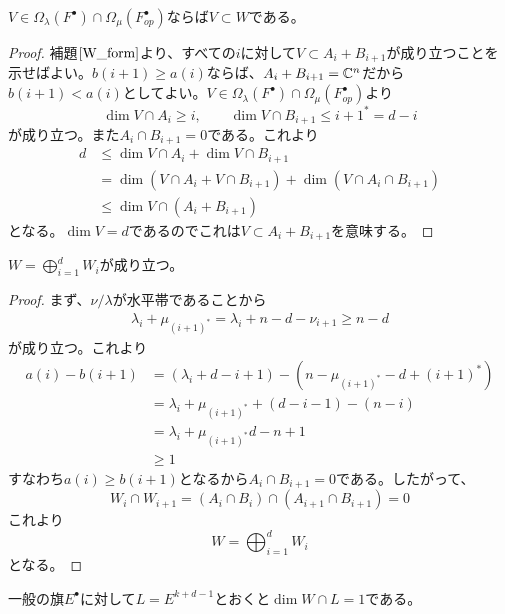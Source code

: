 \documentclass{ltjsreport}
\begin{document}
\begin{lemm}\label{V_subset_W}
  $V\in \Omega_{\lambda}(F^\bullet)\cap\Omega_{\mu}(F^\bullet_{op})$ならば$V\subset W$である。
\end{lemm}

\begin{proof}
  補題$\ref{W_form}$より、すべての$i$に対して$V\subset A_i+B_{i+1}$が成り立つことを示せばよい。$b(i+1)\geq a(i)$ならば、$A_i+B_{i+1}=\mathbb{C}^n$だから$b(i+1)<a(i) $としてよい。$V\in \Omega_{\lambda}(F^\bullet)\cap\Omega_{\mu}(F^\bullet_{op})$より
  \[
  \dim V\cap A_i\geq i,\qquad \dim V\cap B_{i+1}\leq {i+1}^*=d-i  
  \]
  が成り立つ。また$A_i\cap B_{i+1}=0$である。これより
  \begin{align*}
    d&\leq \dim V\cap A_i + \dim  V\cap B_{i+1}\\
    &=\dim (V\cap A_i+ V\cap B_{i+1})+\dim (V\cap A_i\cap B_{i+1})\\
    &\leq \dim V\cap (A_i+B_{i+1})
  \end{align*}
  となる。$\dim V=d$であるのでこれは$V\subset A_i+B_{i+1}$を意味する。
\end{proof}

\begin{lemm}\label{W_direct_sum}
  $W=\bigoplus_{i=1}^d W_i$が成り立つ。
\end{lemm}

\begin{proof}
  まず、$\nu/\lambda$が水平帯であることから
  \begin{align*}
    \lambda_{i}+\mu_{(i+1)^*}=\lambda_i+n-d-\nu_{i+1}\geq n-d
  \end{align*}
  が成り立つ。これより
  \begin{align*}
    a(i)-b(i+1)
    &=(\lambda_i+d-i+1)-(n-\mu_{(i+1)^*}-d+(i+1)^*)\\
    &=\lambda_i+\mu_{(i+1)^*}+(d-i-1)-(n-i)\\
    &=\lambda_i+\mu_{(i+1)^*}d-n+1\\
    &\geq 1
  \end{align*}
  すなわち$a(i)\geq b(i+1)$となるから$A_i\cap B_{i+1}=0$である。したがって、
  \[
  W_i\cap W_{i+1}=(A_i\cap B_i)\cap (A_{i+1}\cap B_{i+1})=0  
  \]
  これより
  \[
  W=\bigoplus_{i=1}^dW_i  
  \]
  となる。
\end{proof}

\begin{lemm}\label{W_cap_L}
  一般の旗$E^\bullet$に対して$L=E^{k+d-1}$とおくと$\dim W\cap L=1$である。
\end{lemm}
\end{document}
